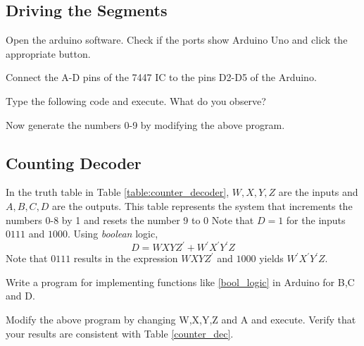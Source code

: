 \subsection{Driving the Segments}
Open the arduino software.  Check if the ports show Arduino Uno and click the appropriate button.  
\begin{problem}
Connect the A-D pins of the 7447 IC to the pins D2-D5 of the Arduino.
\end{problem}	
\begin{problem}
\label{prob:first_code}
Type the following code and execute. What do you observe?

%
\end{problem}
\begin{problem}
Now generate the numbers 0-9 by modifying the above program.
\end{problem}
%

%
\subsection{Counting Decoder}
	In the  truth table in Table \ref{table:counter_decoder},  $W,X,Y,Z$ are the inputs
and $A,B,C,D$ are the outputs. This table represents the system that increments the numbers 0-8 by 1 and resets the number 9 to 0
%
Note that  $D = 1$ for the inputs $0111$ and $1000$.  Using {\em boolean} logic,
%
\begin{equation}
\label{bool_logic}
D = WXYZ^{'} + W^{'}X^{'}Y^{'}Z
\end{equation}
%
Note that $0111$ results in the expression $WXYZ^{'}$ and $1000$ yields $W^{'}X^{'}Y^{'}Z$. 
%
\begin{problem}
	\label{D_code}
Write a program for implementing functions like \eqref{bool_logic} in Arduino for B,C and D.
\end{problem}
%
\solution

%
\begin{problem}
Modify the above program by changing W,X,Y,Z and A and execute.  Verify that your results are consistent with Table \ref{counter_dec}.
\end{problem}

